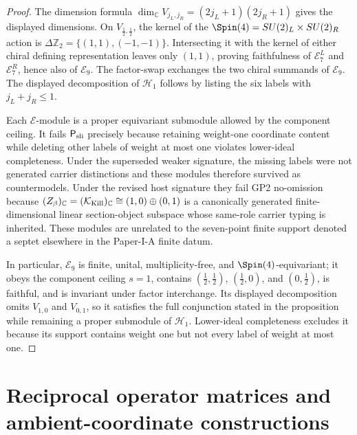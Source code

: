 \documentclass[11pt,a4paper]{article}
\begin{document}
\begin{proof}
The dimension formula
\(\dim_{\mathbb C}V_{j_L,j_R}=(2j_L+1)(2j_R+1)\) gives the displayed
dimensions.  On \(V_{\frac12,\frac12}\), the kernel of the
\(\Spin(4)=SU(2)_L\times SU(2)_R\) action is
\(\Delta\mathbb Z_2=\{(1,1),(-1,-1)\}\).  Intersecting it with the kernel of
either chiral defining representation leaves only \((1,1)\), proving
faithfulness of \(\mathcal E_7^L\) and \(\mathcal E_7^R\), hence also of
\(\mathcal E_9\).  The factor-swap exchanges the two chiral summands of
\(\mathcal E_9\).  The displayed decomposition of \(\mathcal H_1\) follows
by listing the six labels with \(j_L+j_R\le1\).

Each \(\mathcal E\)-module is a proper equivariant submodule allowed by the
component ceiling.  It fails \(\mathsf P_{\rm sli}\) precisely because
retaining weight-one coordinate content while deleting other labels of
weight at most one violates lower-ideal completeness.  Under the superseded weaker signature, the missing labels were not generated
carrier distinctions and these modules therefore survived as countermodels.
Under the revised host signature they fail GP2 no-omission because
\((Z_\beta)_{\mathbb C}=(\mathcal K_{\rm Kill})_{\mathbb C}
\cong(1,0)\oplus(0,1)\) is a canonically generated finite-dimensional linear
section-object subspace whose same-role carrier typing is inherited.  These modules are unrelated to the seven-point finite
support denoted a septet elsewhere in the Paper-I-A finite datum.

In particular, \(\mathcal E_9\) is finite, unital, multiplicity-free, and
\(\Spin(4)\)-equivariant; it obeys the component ceiling \(s=1\), contains
\((\tfrac12,\tfrac12)\), \((\tfrac12,0)\), and
\((0,\tfrac12)\), is faithful, and is invariant under factor interchange.
Its displayed decomposition omits \(V_{1,0}\) and \(V_{0,1}\), so it satisfies
the full conjunction stated in the proposition while remaining a proper
submodule of \(\mathcal H_1\).  Lower-ideal completeness excludes it because
its support contains weight one but not every label of weight at most one.
\end{proof}





\setlength{\emergencystretch}{2em}

\section{Reciprocal operator matrices and ambient-coordinate constructions}
\label{p2ftech:sec:operators}
\end{document}
